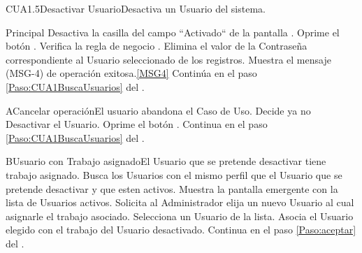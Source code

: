 
\begin{UseCase}{CUA1.5}{Desactivar Usuario}{Desactiva un Usuario del sistema.}
\end{UseCase}

	\begin{UCtrayectoria}{Principal}
			\UCpaso [\UCactor]Desactiva la casilla del campo ``Activado`` de la pantalla .
			\UCpaso [\UCactor]Oprime el botón .\label{Paso:aceptar}
			\UCpaso Verifica la regla de negocio .
			\UCpaso Elimina el valor de la Contraseña correspondiente al Usuario seleccionado de los registros.
			\UCpaso Muestra el mensaje (MSG-4) de operación exitosa.\ref{MSG4}
			\UCpaso Continúa en el paso \ref{Paso:CUA1BuscaUsuarios} del .
	\end{UCtrayectoria}

	\begin{UCtrayectoriaA}{A}{Cancelar operación}{El usuario abandona el Caso de Uso.}
			\UCpaso[\UCactor] Decide ya no Desactivar el Usuario.
			\UCpaso[\UCactor] Oprime el botón .\label{cancelar}
			\UCpaso Continua en el paso \ref{Paso:CUA1BuscaUsuarios} del .
	\end{UCtrayectoriaA}

	\begin{UCtrayectoriaA}{B}{Usuario con Trabajo asignado}{El Usuario que se pretende desactivar tiene trabajo asignado.}
			\UCpaso Busca los Usuarios con el mismo perfil que el Usuario que se pretende desactivar y que esten activos.
			\UCpaso Muestra la pantalla emergente  con la lista de Usuarios activos.
			\UCpaso Solicita al Administrador elija un nuevo Usuario al cual asignarle el trabajo asociado.
			\UCpaso[\UCactor] Selecciona un Usuario de la lista.
			\UCpaso Asocia el Usuario elegido con el trabajo del Usuario desactivado.
			\UCpaso Continua en el paso \ref{Paso:aceptar} del .
	\end{UCtrayectoriaA}


